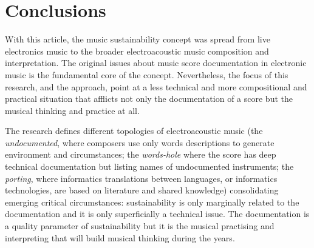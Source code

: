 \documentclass[twoside,a4paper]{article}
\begin{document}
%
%
%
%
%
%
%

\clearpage

\section{Conclusions}

With this article, the music sustainability concept was spread from live electronics music to the broader electroacoustic music composition and interpretation. The original issues \cite{bevi05} about music score documentation in electronic music is the fundamental core of the concept. Nevertheless, the focus of this research, and the approach, point at a less technical and more compositional and practical situation that afflicts not only the documentation of a score but the musical thinking and practice at all.

The research defines different topologies of electroacoustic music (the \emph{undocumented}, where composers use only words descriptions to generate environment and circumstances; the \emph{words-hole} where the score has deep technical documentation but listing names of undocumented instruments; the \emph{porting}, where informatics translations between languages, or informatics technologies, are based on literature and shared knowledge) consolidating emerging critical circumstances: sustainability is only marginally related to the documentation and it is only superficially a technical issue. The documentation is a quality parameter of sustainability but it is the musical practising and interpreting that will build musical thinking during the years.
\end{document}
